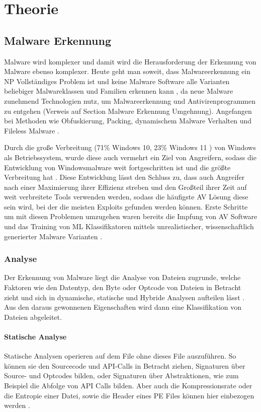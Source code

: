 \chapter{Theorie}
\label{chapter:theorie}

\section{Malware Erkennung}
Malware wird komplexer \cite{pascalmaniriho_2023_a}  und damit wird die Herausforderung der Erkennung von Malware ebenso komplexer. Heute geht man soweit, dass Malwareerkennung ein NP Vollständiges Problem ist \cite{ aslan_2020_a,pascalmaniriho_2023_a} und keine Malware Software alle Varianten beliebiger Malwareklassen und Familien erkennen kann \cite{aboaoja_2022_malware}, da neue Malware zunehmend Technologien nutz, um Malwareerkennung und Antivirenprogrammen zu entgehen (Verweis auf Section Malware Erkennung Umgehnung). Angefangen bei Methoden wie Obfuskierung, Packing, dynamischem Malware Verhalten und Fileless Malware \cite{aslan_2020_a}. 

Durch die große Verbreitung (71\% Windows 10, 23\% Windows 11 \cite{Klotz, A}) von Windows als Betriebssystem, wurde diese auch vermehrt ein Ziel von Angreifern, sodass die Entwicklung von Windowsmalware weit fortgeschritten ist und die größte Verbreitung hat \cite{aslan_2020_a}. Diese Entwicklung lässt den Schluss zu, dass auch Angreifer nach einer Maximierung ihrer Effizienz streben und den Großteil ihrer Zeit auf weit verbreitete Tools verwenden werden, sodass die häufigste AV Lösung diese sein wird, bei der die meisten Exploits gefunden werden können. Erste Schritte um mit diesen Problemen umzugehen waren bereits die Impfung von AV Software \cite{murali_2023_evolving} und das Training von ML Klassifikatoren mittels unrealistischer, wissenschaftlich generierter Malware Varianten \cite{dyrmishi_2023_on}.

\subsection{Analyse}
Der Erkennung von Malware liegt die Analyse von Dateien zugrunde, welche Faktoren wie den Datentyp, den Byte oder Optcode von Dateien in Betracht zieht und sich in dynamische, statische und Hybride Analysen aufteilen lässt \cite{aboaoja_2023_a}. Aus den daraus gewonnenen Eigenschaften wird dann eine Klassifikation von Dateien abgeleitet.
\subsubsection{Statische Analyse}
\label{analyse:statisch}
Statische Analysen operieren auf dem File ohne dieses File auszuführen. So können sie den Sourcecode und API-Calls in Betracht ziehen, Signaturen über Source- und Optcodes bilden, oder Signaturen über Abstraktionen, wie zum Beispiel die Abfolge von API Calls\cite{pascalmaniriho_2023_apimaldetect} bilden. Aber auch die Kompressionsrate oder die Entropie einer Datei, sowie die Header eines PE Files können hier einbezogen werden \cite{aboaoja_2023_a, aslan_2020_a}. 

